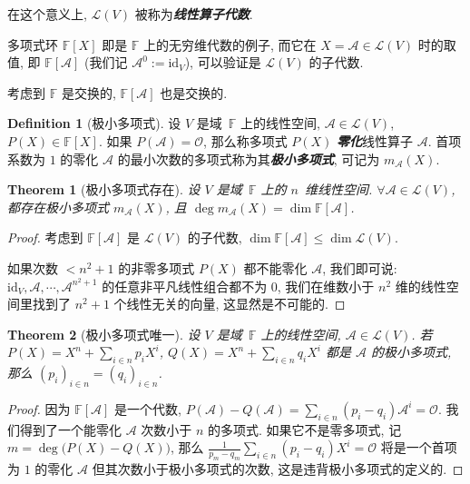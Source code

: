 \documentclass[openany]{ctexbook}
\newcommand*{\indexbf}[1]{\emph{\textbf{#1}}\index{#1}} %
\theoremstyle{plain}
\newtheorem{theorem}{Theorem}[section] %
\theoremstyle{definition}
\newtheorem{definition}{Definition}[section] %
\newcommand*{\id}{\mathrm{id}} %
\begin{document}
在这个意义上, $\mathcal L(V)$ 被称为\indexbf{线性算子代数}.

多项式环 $\mathbb F[X]$ 即是 $\mathbb F$ 上的无穷维代数的例子, 而它在 $X = \mathscr A \in \mathcal L(V)$ 时的取值, 即 $\mathbb F[\mathscr A]$ (我们记 $\mathscr A^0 := \id_V$), 可以验证是 $\mathcal L(V)$ 的子代数.

考虑到 $\mathbb F$ 是交换的, $\mathbb F[\mathscr A]$ 也是交换的. 

\begin{definition}[极小多项式]
	设 $V$ 是域~$\mathbb F$ 上的线性空间, $\mathscr A \in \mathcal L(V)$, $P(X) \in \mathbb F[X]$.
	如果 $P(\mathscr A) = \mathscr O$, 那么称多项式 $P(X)$ \indexbf{零化}线性算子 $\mathscr A$. 首项系数为 $1$ 的零化 $\mathscr A$ 的最小次数的多项式称为其\indexbf{极小多项式}, 可记为 $m_{\mathscr A}(X)$.
\end{definition}

\begin{theorem}[极小多项式存在]
	设 $V$ 是域~$\mathbb F$ 上的 $n$~维线性空间. 
	$\forall \mathscr A \in \mathcal L(V)$, 都存在极小多项式 $m_\mathscr A (X)$, 且 $\deg m_{\mathscr A} (X) = \dim \mathbb F[\mathscr A]$.
\end{theorem}
\begin{proof}
	考虑到 $\mathbb F[\mathscr A]$ 是 $\mathcal L(V)$ 的子代数, $\dim \mathbb F[\mathscr A] \leq \dim \mathcal L(V)$. 

	如果次数 $< n^2 + 1$ 的非零多项式 $P(X)$ 都不能零化 $\mathscr A$, 我们即可说: 
	$\id_V, \mathscr A, \cdots, \mathscr A^{n^2 + 1}$ 的任意非平凡线性组合都不为 $0$, 我们在维数小于 $n^2$ 维的线性空间里找到了 $n^2 + 1$ 个线性无关的向量, 这显然是不可能的.
\end{proof}

\begin{theorem}[极小多项式唯一]
	设 $V$ 是域~$\mathbb F$ 上的线性空间, $\mathscr A \in \mathcal L(V)$. 
	若 $P(X) = X^n + \sum_{i \in n} p_i X^i$, $Q(X) = X^n + \sum_{i \in n} q_i X^i$ 都是 $\mathscr A$ 的极小多项式, 那么 $(p_i)_{i \in n} = (q_i)_{i \in n}$.
\end{theorem}
\begin{proof}
	因为 $\mathbb F[\mathscr A]$ 是一个代数, $P(\mathscr A) - Q(\mathscr A) = \sum_{i \in n} (p_i - q_i) \mathscr A^i = \mathscr O$. 
	我们得到了一个能零化 $\mathscr A$ 次数小于 $n$ 的多项式. 
	如果它不是零多项式, 记 $m = \deg \big( P(X) - Q(X)\big)$, 那么 $\frac{1}{p_m - q_m} \sum_{i \in n} (p_i - q_i) X^i = \mathscr O$ 将是一个首项为 $1$ 的零化 $\mathscr A$ 但其次数小于极小多项式的次数, 这是违背极小多项式的定义的.
\end{proof}
\end{document}
